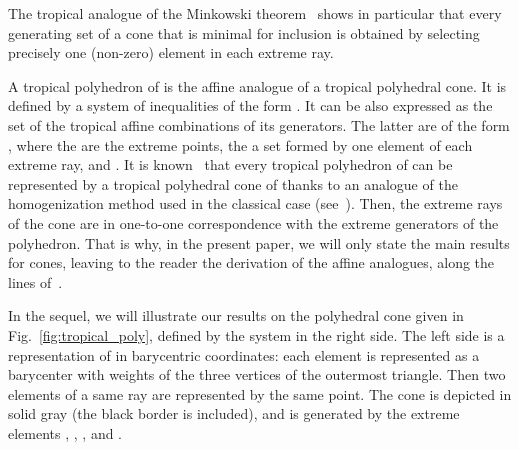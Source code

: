 \documentclass[proceedings]{stacs}
\begin{document}
The tropical analogue of the Minkowski theorem~\cite{GK,BSS} shows in particular that every generating set of a cone that is minimal for inclusion is obtained by selecting precisely one (non-zero) element in each extreme ray. 




A tropical polyhedron of  is the affine analogue of a tropical polyhedral cone. It is defined by a system of inequalities of the form . It can be also expressed as the set of the tropical affine combinations of its generators. The latter are of the form , where the  are the extreme points, the  a set formed by one element of each extreme ray, and .
It is known~\cite{cgq02,GK} that every tropical polyhedron of  can be represented by a tropical polyhedral cone of  thanks to an analogue of the homogenization method used in the classical case (see~\cite[Sect.~1.5]{ziegler98}). Then, the extreme rays of the cone are in one-to-one correspondence with the extreme generators of the polyhedron. That is why, in the present paper, we will only state the main results for cones, leaving to the reader the derivation of the affine analogues, along the lines of~\cite{GK}.









In the sequel, we will illustrate our results on the polyhedral cone  given in Fig.~\ref{fig:tropical_poly}, defined by the system in the right side. The left side is a representation of  in barycentric coordinates: each element  is represented as a barycenter with weights  of the three vertices of the outermost triangle. Then two
elements of a same ray are represented by the same point. 
The cone  is depicted in solid gray (the black border is included), and is generated by the extreme elements , , , and .
\end{document}
